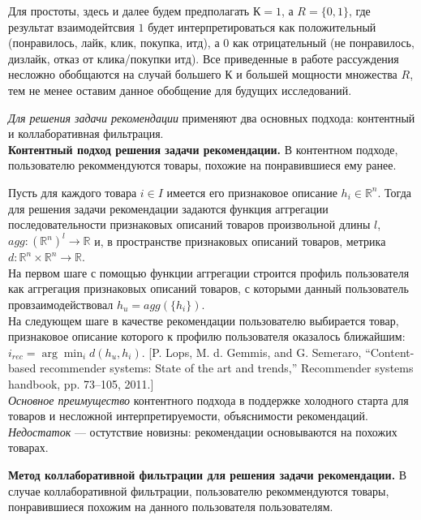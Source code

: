 \documentclass{mipt-thesis-ms}
\begin{document}
Для простоты, здесь и далее будем предполагать $К = 1$, а $R = \{0, 1\}$, где результат взаимодейтсвия $1$ будет интерпретироваться как положительный (понравилось, лайк, клик, покупка, итд), а $0$ как отрицательный (не понравилось, дизлайк, отказ от клика/покупки итд). Все приведенные в работе рассуждения несложно обобщаются на случай большего $К$ и большей мощности множества $R$, тем не менее оставим данное обобщение для будущих исследований.

{\it Для решения задачи рекомендации} применяют два основных подхода: контентный и коллаборативная фильтрация.
\\

{\bf Контентный подход решения задачи рекомендации.} В контентном подходе, пользователю рекоммендуются товары, похожие на понравившиеся ему ранее.

Пусть для каждого товара $i \in I$ имеется его признаковое описание $h_i \in \mathbb{R}^n$. Тогда для решения задачи рекомендации задаются функция аггрегации последовательности признаковых описаний товаров произвольной длины $l$, $agg: (\mathbb{R}^n)^l \rightarrow \mathbb{R}$ и, в пространстве признаковых описаний товаров, метрика $d: \mathbb{R}^n \times \mathbb{R}^n \rightarrow \mathbb{R}$. \\
На первом шаге с помощью функции аггрегации строится профиль пользователя как аггрегация признаковых описаний товаров, с которыми данный пользователь провзаимодействовал $h_u = agg(\{h_i\})$. \\
На следующем шаге в качестве рекомендации пользователю выбирается товар, признаковое описание которого к профилю пользователя оказалось ближайшим: $i_{rec} = \arg \min_i d(h_u, h_i)$. [P. Lops, M. d. Gemmis, and G. Semeraro, “Content-based recommender systems: State of the art and trends,”
Recommender systems handbook, pp. 73–105, 2011.]
\\

{\it Основное преимущество} контентного подхода в поддержке холодного старта для товаров и несложной интерпретируемости, объяснимости рекомендаций. {\it Недостаток} --- остутствие новизны: рекомендации основываются на похожих товарах.

{\bf Метод коллаборативной фильтрации для решения задачи рекомендации.} В случае коллаборативной фильтрации, пользователю рекоммендуются товары, понравившиеся похожим на данного пользователя пользователям.
\end{document}

